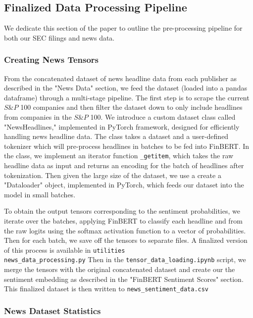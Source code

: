 \subsection{Finalized Data Processing Pipeline}
We dedicate this section of the paper to outline the pre-processing pipeline for both our SEC filings and news data.

\subsubsection{Creating News Tensors}\label{newstensors}

From the concatenated dataset of news headline data from each publisher as described in the "News Data" section, we feed the dataset (loaded into a pandas dataframe) through a multi-stage pipeline. 
The first step is to scrape the current $S\&P$ 100 companies and then filter the dataset down to only include headlines from companies in the $S\&P$ 100. 
We introduce a custom dataset class called "NewsHeadlines," implemented in PyTorch framework, designed for efficiently handling news headline data. 
The class takes a dataset and a user-defined tokenizer which will pre-process headlines in batches to be fed into FinBERT. 
In the class, we implement an iterator function \texttt{\_getitem}, which takes the raw headline data as input and returns an encoding for the batch of headlines after tokenization. 
Then given the large size of the dataset, we use a create a "Dataloader" object, implemented in PyTorch, which feeds our dataset into the model in small batches. 

To obtain the output tensors corresponding to the sentiment probabilities, we iterate over the batches, applying FinBERT to classify each headline and from the raw logits using the softmax activation function to a vector of probabilities.
Then for each batch, we save off the tensors to separate files. A finalized version of this process is available in \texttt{utilities\\news\_data\_processing.py}
Then in the \texttt{tensor\_data\_loading.ipynb} script, we merge the tensors with the original concatenated dataset and create our the sentiment embedding as described in the "FinBERT Sentiment Scores" section. 
This finalized dataset is then written to \texttt{news\_sentiment\_data.csv}

\subsubsection{News Dataset Statistics}

